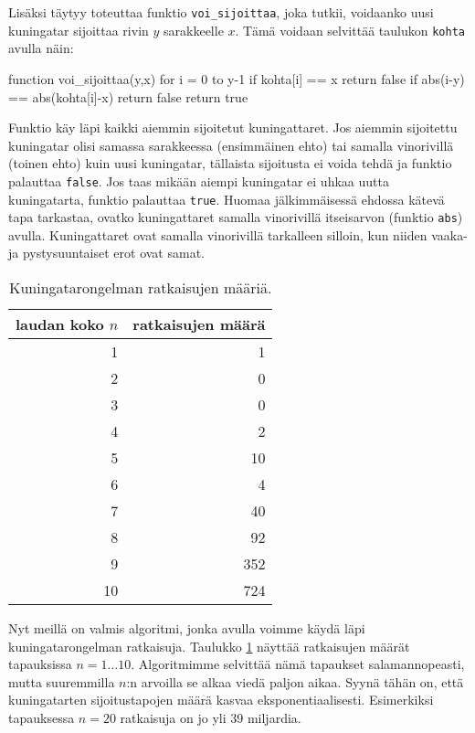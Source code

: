 Lisäksi täytyy toteuttaa funktio \texttt{voi\_sijoittaa},
joka tutkii, voidaanko uusi kuningatar sijoittaa
rivin $y$ sarakkeelle $x$.
Tämä voidaan selvittää taulukon \texttt{kohta} avulla näin:

\begin{code}
function voi_sijoittaa(y,x)
    for i = 0 to y-1
        if kohta[i] == x
            return false
        if abs(i-y) == abs(kohta[i]-x)
            return false
    return true
\end{code}

Funktio käy läpi kaikki aiemmin sijoitetut kuningattaret.
Jos aiemmin sijoitettu kuningatar olisi samassa sarakkeessa
(ensimmäinen ehto) tai samalla vinorivillä (toinen ehto)
kuin uusi kuningatar, tällaista sijoitusta ei voida tehdä
ja funktio palauttaa \texttt{false}.
Jos taas mikään aiempi kuningatar ei uhkaa uutta kuningatarta,
funktio palauttaa \texttt{true}.
Huomaa jälkimmäisessä ehdossa kätevä tapa tarkastaa,
ovatko kuningattaret samalla vinorivillä itseisarvon
(funktio \texttt{abs}) avulla.
Kuningattaret ovat samalla vinorivillä tarkalleen silloin,
kun niiden vaaka- ja pystysuuntaiset erot ovat samat.

\begin{table}
\center
\begin{tabular}{rr}
laudan koko $n$ & ratkaisujen määrä \\
\hline
1 & 1 \\
2 & 0 \\
3 & 0 \\
4 & 2 \\
5 & 10 \\
6 & 4 \\
7 & 40 \\
8 & 92 \\
9 & 352 \\
10 & 724 \\
\end{tabular}
\caption{Kuningatarongelman ratkaisujen määriä.}
\label{tab:kuning}
\end{table}

Nyt meillä on valmis algoritmi, jonka avulla voimme
käydä läpi kuningatarongelman ratkaisuja.
Taulukko \ref{tab:kuning} näyttää ratkaisujen määrät
tapauksissa $n=1 \dots 10$.
Algoritmimme selvittää nämä tapaukset salamannopeasti,
mutta suuremmilla $n$:n arvoilla se alkaa viedä paljon aikaa.
Syynä tähän on, että kuningatarten sijoitustapojen
määrä kasvaa eksponentiaalisesti.
Esimerkiksi tapauksessa $n=20$ ratkaisuja on jo yli 39 miljardia.

